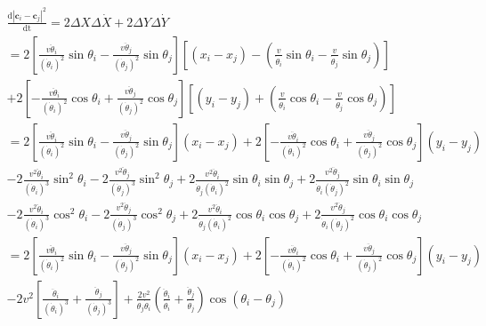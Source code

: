 \documentclass{article}
\begin{document}
\begin{equation}\label{eq:distanceCenterSquare}
    \begin{array}{l}
        \frac{\mathrm{d}\left| \mathbf{c}_i-\mathbf{c}_j \right|^2}{\mathrm{dt}}=2\Delta X\Delta \dot{X}+2\Delta Y\Delta \dot{Y}\\
        =2\left[ \frac{v\ddot{\theta}_i}{\left( \dot{\theta}_i \right) ^2}\sin \theta _i-\frac{v\ddot{\theta}_j}{\left( \dot{\theta}_j \right) ^2}\sin \theta _j \right] \left[ \left( x_i-x_j \right) -\left( \frac{v}{\dot{\theta}_i}\sin \theta _i-\frac{v}{\dot{\theta}_j}\sin \theta _j \right) \right]\\
        +2\left[ -\frac{v\ddot{\theta}_i}{\left( \dot{\theta}_i \right) ^2}\cos \theta _i+\frac{v\ddot{\theta}_j}{\left( \dot{\theta}_j \right) ^2}\cos \theta _j \right] \left[ \left( y_i-y_j \right) +\left( \frac{v}{\dot{\theta}_i}\cos \theta _i-\frac{v}{\dot{\theta}_j}\cos \theta _j \right) \right]\\
        =2\left[ \frac{v\ddot{\theta}_i}{\left( \dot{\theta}_i \right) ^2}\sin \theta _i-\frac{v\ddot{\theta}_j}{\left( \dot{\theta}_j \right) ^2}\sin \theta _j \right] \left( x_i-x_j \right) +2\left[ -\frac{v\ddot{\theta}_i}{\left( \dot{\theta}_i \right) ^2}\cos \theta _i+\frac{v\ddot{\theta}_j}{\left( \dot{\theta}_j \right) ^2}\cos \theta _j \right] \left( y_i-y_j \right)\\
        -2\frac{v^2\ddot{\theta}_i}{\left( \dot{\theta}_i \right) ^3}\sin ^2\theta _i-2\frac{v^2\ddot{\theta}_j}{\left( \dot{\theta}_j \right) ^3}\sin ^2\theta _j+2\frac{v^2\ddot{\theta}_i}{\dot{\theta}_j\left( \dot{\theta}_i \right) ^2}\sin \theta _i\sin \theta _j+2\frac{v^2\ddot{\theta}_j}{\dot{\theta}_i\left( \dot{\theta}_j \right) ^2}\sin \theta _i\sin \theta _j\\
        -2\frac{v^2\ddot{\theta}_i}{\left( \dot{\theta}_i \right) ^3}\cos ^2\theta _i-2\frac{v^2\ddot{\theta}_j}{\left( \dot{\theta}_j \right) ^3}\cos ^2\theta _j+2\frac{v^2\ddot{\theta}_i}{\dot{\theta}_j\left( \dot{\theta}_i \right) ^2}\cos \theta _i\cos \theta _j+2\frac{v^2\ddot{\theta}_j}{\dot{\theta}_i\left( \dot{\theta}_j \right) ^2}\cos \theta _i\cos \theta _j\\
        =2\left[ \frac{v\ddot{\theta}_i}{\left( \dot{\theta}_i \right) ^2}\sin \theta _i-\frac{v\ddot{\theta}_j}{\left( \dot{\theta}_j \right) ^2}\sin \theta _j \right] \left( x_i-x_j \right) +2\left[ -\frac{v\ddot{\theta}_i}{\left( \dot{\theta}_i \right) ^2}\cos \theta _i+\frac{v\ddot{\theta}_j}{\left( \dot{\theta}_j \right) ^2}\cos \theta _j \right] \left( y_i-y_j \right)\\
        -2v^2\left[ \frac{\ddot{\theta}_i}{\left( \dot{\theta}_i \right) ^3}+\frac{\ddot{\theta}_j}{\left( \dot{\theta}_j \right) ^3} \right] +\frac{2v^2}{\dot{\theta}_j\dot{\theta}_i}\left( \frac{\ddot{\theta}_i}{\dot{\theta}_i}+\frac{\ddot{\theta}_j}{\dot{\theta}_j} \right) \cos \left( \theta _i-\theta _j \right)\\
    \end{array}
\end{equation}
\end{document}
